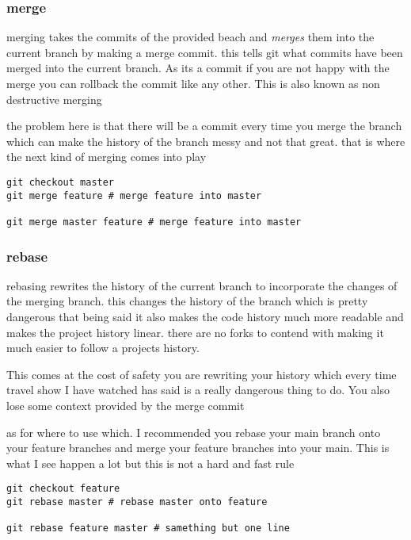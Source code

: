 \documentclass[a4paper]{article}
\begin{document}
\subsubsection*{merge}
\label{sec:org7b786be}
\begin{notes}
merging takes the commits of the provided beach and \emph{merges} them into the current
branch by making a merge commit. this tells git what commits have been merged
into the current branch. As its a commit if you are not happy with the merge you
can rollback the commit like any other. This is also known as non destructive
merging

the problem here is that there will be a commit every time you merge the branch
which can make the history of the branch messy and not that great. that is where
the next kind of merging comes into play
\end{notes}

\begin{verbatim}
git checkout master
git merge feature # merge feature into master

git merge master feature # merge feature into master
\end{verbatim}

\subsubsection*{rebase}
\label{sec:orgcb05308}
\begin{notes}
rebasing rewrites the history of the current branch to incorporate the changes
of the merging branch. this changes the history of the branch which is pretty
dangerous that being said it also makes the code history much more readable
and makes the project history linear. there are no forks to contend with making
it much easier to follow a projects history.

This comes at the cost of safety you are rewriting your history which every time
travel show I have watched has said is a really dangerous thing to do. You also
lose some context provided by the merge commit

as for where to use which. I
recommended you rebase your main branch onto your feature branches and merge your
feature branches into your main. This is what I see happen a lot but this is not
a hard and fast rule
\end{notes}

\begin{verbatim}
git checkout feature
git rebase master # rebase master onto feature

git rebase feature master # samething but one line
\end{verbatim}
\end{document}
